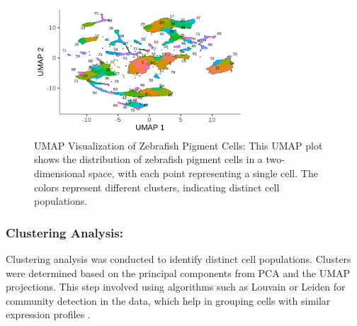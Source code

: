 \documentclass[runningheads]{llncs}
\begin{document}
\begin{figure}[htbp]
\centering
\includegraphics[height=0.3\textheight,width=0.7\textwidth]{umap.png}
\caption{UMAP Visualization of Zebrafish Pigment Cells: This UMAP plot shows the distribution of zebrafish pigment cells in a two-dimensional space, with each point representing a single cell. The colors represent different clusters, indicating distinct cell populations.}
\label{fig_umap_dimensions}
\end{figure}

\subsubsection{Clustering Analysis:} Clustering analysis was conducted to identify distinct cell populations. Clusters were determined based on the principal components from PCA and the UMAP projections. This step involved using algorithms such as Louvain or Leiden for community detection in the data, which help in grouping cells with similar expression profiles \cite{street2018slingshot}.
\end{document}
